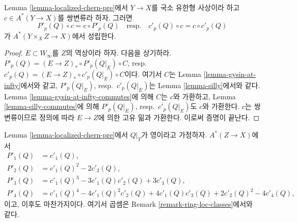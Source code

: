 \begin{lemma}
\label{lemma-homomorphism-commute}
Lemma \ref{lemma-localized-chern-pre}에서 $Y \to X$를 국소 유한형 사상이라
하고 $c \in A^*(Y \to X)$를 쌍변류라 하자. 그러면
$$
P'_p(Q) \circ c = c \circ P'_p(Q)
\quad\text{resp.}\quad
c'_p(Q) \circ c = c \circ c'_p(Q)
$$
가 $A^*(Y \times_X Z \to X)$에서 성립한다.
\end{lemma}

\begin{proof}
$E \subset W_\infty$를 $Z$의 역상이라 하자. 다음을 상기하라.
$P'_p(Q) = (E \to Z)_* \circ P'_p(Q|_E) \circ C$,
resp.\ $c'_p(Q) = (E \to Z)_* \circ c'_p(Q|_E) \circ C$이다. 여기서
$C$는 Lemma \ref{lemma-gysin-at-infty}에서와 같고,
$P'_p(Q|_E)$, resp.\ $c'_p(Q|_E)$는 Lemma \ref{lemma-silly}에서와 같다.
Lemma \ref{lemma-gysin-at-infty-commutes}에 의해 $C$는 $c$와 가환하고,
Lemma \ref{lemma-silly-commutes}에 의해 $P'_p(Q|_E)$,
resp.\ $c'_p(Q|_E)$도 $c$와 가환한다. $c$는 쌍변류이므로 정의에 따라
$E \to Z$에 의한 고유 밂과 가환한다. 이로써 증명이 끝난다.
\end{proof}

\begin{lemma}
\label{lemma-localized-chern-pre-compose}
Lemma \ref{lemma-localized-chern-pre}에서 $Q|_T$가 영이라고 가정하자.
$A^*(Z \to X)$에서
\begin{align*}
P'_1(Q) & = c'_1(Q), \\
P'_2(Q) & = c'_1(Q)^2 - 2c'_2(Q), \\
P'_3(Q) & = c'_1(Q)^3 - 3c'_1(Q)c'_2(Q) + 3c'_3(Q), \\
P'_4(Q) & = c'_1(Q)^4 - 4c'_1(Q)^2c'_2(Q) +
4c'_1(Q)c'_3(Q) + 2c'_2(Q)^2 - 4c'_4(Q),
\end{align*}
이고, 이후도 마찬가지이다. 여기서 곱셈은 Remark
\ref{remark-ring-loc-classes}에서와 같다.
\end{lemma}

